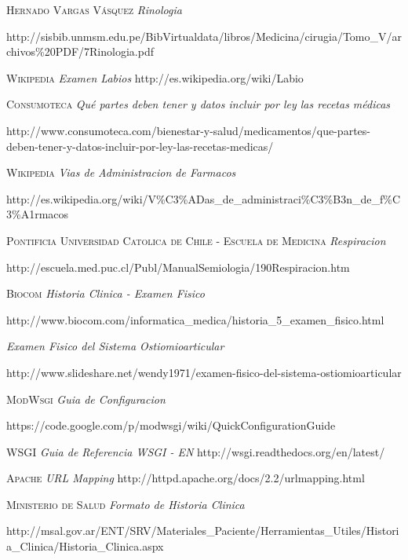 \begin{thebibliography}{X}
     \textsc{Hernado Vargas Vásquez} \textit{Rinologia}

    http://sisbib.unmsm.edu.pe/BibVirtualdata/libros/Medicina/cirugia/Tomo\_V/archivos\%20PDF/7Rinologia.pdf

     \textsc{Wikipedia} \textit{Examen Labios} http://es.wikipedia.org/wiki/Labio

     \textsc{Consumoteca} \textit{Qué partes deben tener y datos incluir por ley las recetas médicas}

    http://www.consumoteca.com/bienestar-y-salud/medicamentos/que-partes-deben-tener-y-datos-incluir-por-ley-las-recetas-medicas/

     \textsc{Wikipedia} \textit{Vias de Administracion de Farmacos}

    http://es.wikipedia.org/wiki/V\%C3\%ADas\_de\_administraci\%C3\%B3n\_de\_f\%C3\%A1rmacos
    
     \textsc{Pontificia Universidad Catolica de Chile - Escuela de Medicina} \textit{Respiracion}

    http://escuela.med.puc.cl/Publ/ManualSemiologia/190Respiracion.htm

     \textsc{Biocom} \textit{Historia Clinica - Examen Fisico}

    http://www.biocom.com/informatica\_medica/historia\_5\_examen\_fisico.html

     \textit{Examen Fisico del Sistema Ostiomioarticular}
    
    http://www.slideshare.net/wendy1971/examen-fisico-del-sistema-ostiomioarticular
    
     \textsc{ModWsgi} \textit{Guia de Configuracion}

    https://code.google.com/p/modwsgi/wiki/QuickConfigurationGuide
 
     \textsc{WSGI} \textit{Guia de Referencia WSGI - EN} http://wsgi.readthedocs.org/en/latest/
    
     \textsc{Apache} \textit{URL Mapping} http://httpd.apache.org/docs/2.2/urlmapping.html

     \textsc{Ministerio de Salud } \textit{Formato de Historia Clinica}
    
    http://msal.gov.ar/ENT/SRV/Materiales\_Paciente/Herramientas\_Utiles/Historia\_Clinica/Historia\_Clinica.aspx
    

\end{thebibliography}

